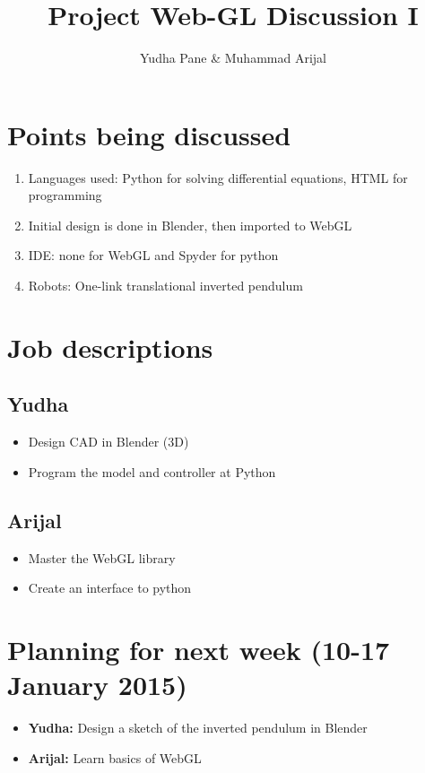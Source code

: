 \documentclass[]{article}
\title{Project Web-GL Discussion I}
\author{Yudha Pane \& Muhammad Arijal}
\begin{document}
\maketitle

\section{Points being discussed}
\begin{enumerate}
	\item Languages used: Python for solving differential equations, HTML for programming
	\item Initial design is done in Blender, then imported to WebGL
	\item IDE: none for WebGL and Spyder for python
	\item Robots: One-link translational inverted pendulum
\end{enumerate}

\section{Job descriptions}
\subsection{Yudha}
	\begin{itemize}
		\item Design CAD in Blender (3D)
		\item Program the model and controller at Python		
	\end{itemize}

\subsection{Arijal}
	\begin{itemize}
		\item Master the WebGL library
		\item Create an interface to python
	\end{itemize}
	
\section{Planning for next week (10-17 January 2015)}
	\begin{itemize}
		\item \textbf{Yudha:} Design a sketch of the inverted pendulum in Blender 
		\item \textbf{Arijal:} Learn basics of WebGL 
	\end{itemize}
	
	
\end{document}
